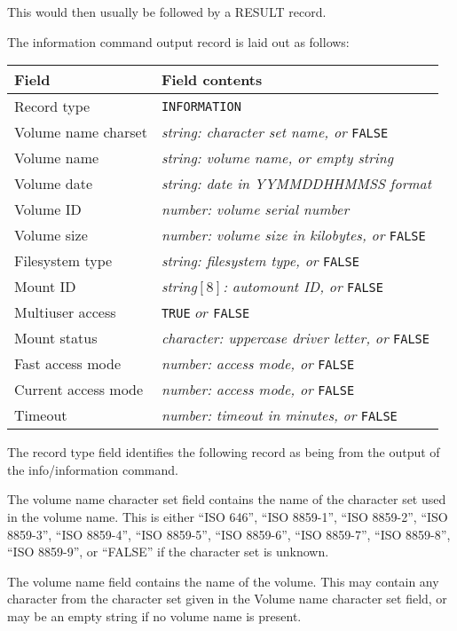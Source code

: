 This would then usually be followed by a RESULT record.

The information command output record is laid out as follows:

\begin{center}
\begin{tabular}{|l|l|}
\hline
    Field              & Field contents\\
\hline
    Record type        & {\tt INFORMATION}\\
    Volume name charset& {\em string: character set name, or} {\tt FALSE}\\
    Volume name        & {\em string: volume name, or empty string}\\
    Volume date        & {\em string: date in YYMMDDHHMMSS format}\\
    Volume ID          & {\em number: volume serial number}\\
    Volume size        & {\em number: volume size in kilobytes, or} {\tt FALSE}\\
    Filesystem type    & {\em string: filesystem type, or} {\tt FALSE}\\
    Mount ID           & {\em string$[8]$: automount ID, or} {\tt FALSE}\\
    Multiuser access   & {\tt TRUE} $or$ {\tt FALSE}\\
    Mount status       & {\em character: uppercase driver letter, or} {\tt FALSE}\\
    Fast access mode   & {\em number: access mode, or} {\tt FALSE}\\
    Current access mode& {\em number: access mode, or} {\tt FALSE}\\
    Timeout            & {\em number: timeout in minutes, or} {\tt FALSE}\\
\hline
\end{tabular}
\end{center}

The record type field identifies the following record as being from the output
of the info/information command.

The volume name character set field contains the name of the character set used
in the volume name.  This is either ``ISO 646'', ``ISO 8859-1'', ``ISO 8859-2'', ``ISO
8859-3'', ``ISO 8859-4'', ``ISO 8859-5'', ``ISO 8859-6'', ``ISO 8859-7'', ``ISO 8859-8'',
``ISO 8859-9'', or ``FALSE'' if the character set is unknown.

The volume name field contains the name of the volume.  This may contain any
character from the character set given in the Volume name character set field,
or may be an empty string if no volume name is present.

